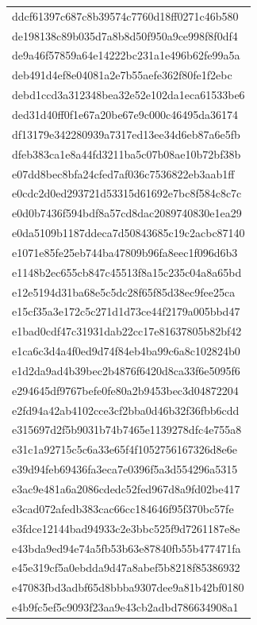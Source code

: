\begin{tabular}{l}
ddcf61397c687c8b39574c7760d18ff0271c46b580 \\
de198138c89b035d7a8b8d50f950a9ce998f8f0df4 \\
de9a46f57859a64e14222bc231a1e496b62fe99a5a \\
deb491d4ef8e04081a2e7b55aefe362f80fe1f2ebc \\
debd1ccd3a312348bea32e52e102da1eca61533be6 \\
ded31d40ff0f1e67a20be67e9c000c46495da36174 \\
df13179e342280939a7317ed13ee34d6eb87a6e5fb \\
dfeb383ca1e8a44fd3211ba5c07b08ae10b72bf38b \\
e07dd8bec8bfa24cfed7af036c7536822eb3aab1ff \\
e0cdc2d0ed293721d53315d61692e7bc8f584c8c7c \\
e0d0b7436f594bdf8a57cd8dac2089740830e1ea29 \\
e0da5109b1187ddeca7d50843685c19c2acbc87140 \\
e1071e85fe25eb744ba47809b96fa8eec1f096d6b3 \\
e1148b2ec655cb847c45513f8a15c235c04a8a65bd \\
e12e5194d31ba68e5c5dc28f65f85d38ec9fee25ca \\
e15cf35a3e172c5c271d1d73ce44f2179a005bbd47 \\
e1bad0cdf47c31931dab22cc17e81637805b82bf42 \\
e1ca6c3d4a4f0ed9d74f84eb4ba99c6a8c102824b0 \\
e1d2da9ad4b39bec2b4876f6420d8ca33f6e5095f6 \\
e294645df9767befe0fe80a2b9453bec3d04872204 \\
e2fd94a42ab4102cce3cf2bba0d46b32f36fbb6cdd \\
e315697d2f5b9031b74b7465e1139278dfc4e755a8 \\
e31c1a92715c5c6a33e65f4f1052756167326d8e6e \\
e39d94feb69436fa3eca7e0396f5a3d554296a5315 \\
e3ac9e481a6a2086cdedc52fed967d8a9fd02be417 \\
e3cad072afedb383cac66cc184646f95f370bc57fe \\
e3fdce12144bad94933c2e3bbc525f9d7261187e8e \\
e43bda9ed94e74a5fb53b63e87840fb55b477471fa \\
e45e319cf5a0ebdda9d47a8abef5b8218f85386932 \\
e47083fbd3adbf65d8bbba9307dee9a81b42bf0180 \\
e4b9fc5ef5c9093f23aa9e43cb2adbd786634908a1 \\

\end{tabular}
